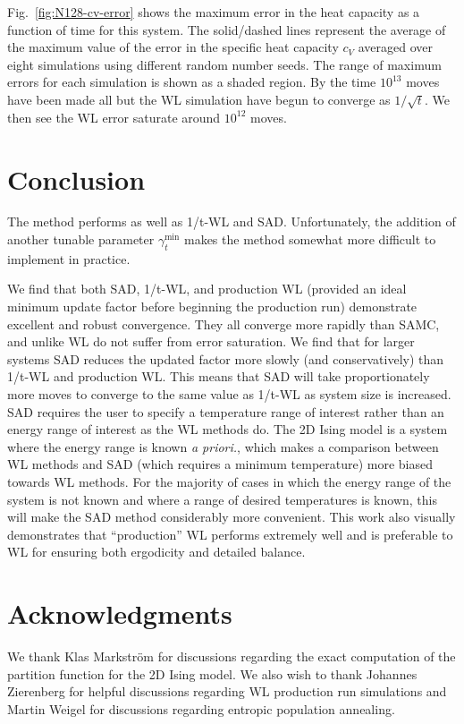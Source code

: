 \documentclass[letterpaper,twocolumn,amsmath,amssymb,pre,aps,10pt]{revtex4-1}
\begin{document}
Fig.~\ref{fig:N128-cv-error} shows the maximum error in the heat capacity as a function of time for
this system. The solid/dashed lines
represent the average of the maximum value of the error in the specific heat capacity $c_V$ averaged
over eight simulations using different random number seeds. The range of maximum
errors for each simulation is shown as a shaded region. By
the time $10^{13}$ moves have been made all but the WL simulation have begun to
converge as $1/\sqrt{t}$. We then see the WL error saturate around $10^{12}$ moves.

\section{Conclusion}
The method performs as well as 1/t-WL and SAD.  Unfortunately, the addition of another tunable parameter $\gamma_{t}^{\min}$ makes the method somewhat more difficult to implement in practice.

We find that both SAD, 1/t-WL, and production WL (provided an ideal minimum update factor before beginning the production run) demonstrate excellent and robust convergence.
They all converge more rapidly than SAMC, and unlike WL do not suffer from
error saturation. We find that for larger systems SAD reduces the updated factor
more slowly (and conservatively) than 1/t-WL and production WL. This means that SAD will take
proportionately more moves to converge to the same value as 1/t-WL as system
size is increased. SAD requires the user to specify a temperature range of
interest rather than an energy range of interest as the WL methods do. The 2D Ising model is a system where the energy range is known \emph{a priori.}, which makes a comparison between WL methods and SAD (which requires a minimum temperature) more biased towards WL methods. For the majority of cases in which the energy range of the system is not known and where a range of desired temperatures is known, this will make the SAD method
considerably more convenient. This work also visually demonstrates that ``production'' WL performs extremely well and is preferable to WL for ensuring both ergodicity and detailed balance.

\section{Acknowledgments}

We thank Klas Markstr\"{o}m for discussions regarding the exact computation of the partition function for the 2D Ising model. We also wish to thank Johannes Zierenberg for helpful discussions regarding WL production run simulations and
Martin Weigel for discussions regarding entropic population annealing.

\end{document}
